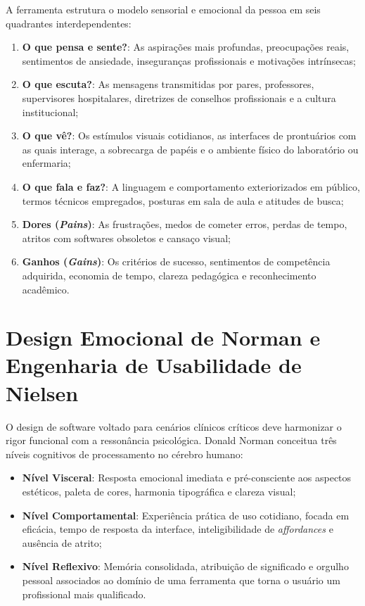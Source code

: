 A ferramenta estrutura o modelo sensorial e emocional da pessoa em seis quadrantes interdependentes:
\begin{enumerate}
    \item \textbf{O que pensa e sente?}: As aspirações mais profundas, preocupações reais, sentimentos de ansiedade, inseguranças profissionais e motivações intrínsecas;
    \item \textbf{O que escuta?}: As mensagens transmitidas por pares, professores, supervisores hospitalares, diretrizes de conselhos profissionais e a cultura institucional;
    \item \textbf{O que vê?}: Os estímulos visuais cotidianos, as interfaces de prontuários com as quais interage, a sobrecarga de papéis e o ambiente físico do laboratório ou enfermaria;
    \item \textbf{O que fala e faz?}: A linguagem e comportamento exteriorizados em público, termos técnicos empregados, posturas em sala de aula e atitudes de busca;
    \item \textbf{Dores (\textit{Pains})}: As frustrações, medos de cometer erros, perdas de tempo, atritos com softwares obsoletos e cansaço visual;
    \item \textbf{Ganhos (\textit{Gains})}: Os critérios de sucesso, sentimentos de competência adquirida, economia de tempo, clareza pedagógica e reconhecimento acadêmico.
\end{enumerate}

\section{Design Emocional de Norman e Engenharia de Usabilidade de Nielsen}
\label{sec_norman_nielsen}

O design de software voltado para cenários clínicos críticos deve harmonizar o rigor funcional com a ressonância psicológica. Donald Norman \cite{norman2004, norman2013} conceitua três níveis cognitivos de processamento no cérebro humano:
\begin{itemize}
    \item \textbf{Nível Visceral}: Resposta emocional imediata e pré-consciente aos aspectos estéticos, paleta de cores, harmonia tipográfica e clareza visual;
    \item \textbf{Nível Comportamental}: Experiência prática de uso cotidiano, focada em eficácia, tempo de resposta da interface, inteligibilidade de \textit{affordances} e ausência de atrito;
    \item \textbf{Nível Reflexivo}: Memória consolidada, atribuição de significado e orgulho pessoal associados ao domínio de uma ferramenta que torna o usuário um profissional mais qualificado.
\end{itemize}

